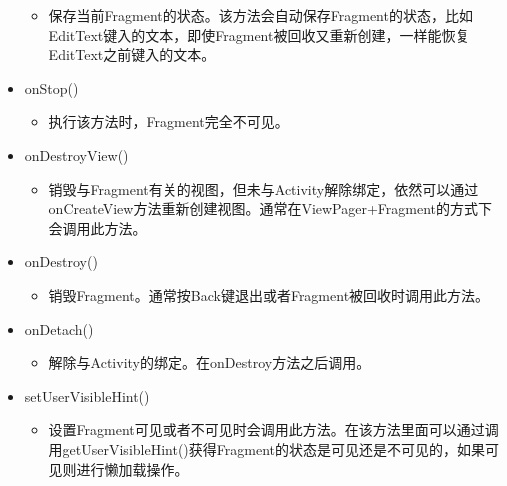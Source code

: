 \documentclass[9pt, b5paper]{article}
\begin{document}
\begin{itemize}
\begin{itemize}
\item 保存当前Fragment的状态。该方法会自动保存Fragment的状态，比如EditText键入的文本，即使Fragment被回收又重新创建，一样能恢复EditText之前键入的文本。
\end{itemize}
\item onStop()
\begin{itemize}
\item 执行该方法时，Fragment完全不可见。
\end{itemize}
\item onDestroyView()
\begin{itemize}
\item 销毁与Fragment有关的视图，但未与Activity解除绑定，依然可以通过onCreateView方法重新创建视图。通常在ViewPager+Fragment的方式下会调用此方法。
\end{itemize}
\item onDestroy()
\begin{itemize}
\item 销毁Fragment。通常按Back键退出或者Fragment被回收时调用此方法。
\end{itemize}
\item onDetach()
\begin{itemize}
\item 解除与Activity的绑定。在onDestroy方法之后调用。
\end{itemize}
\item setUserVisibleHint()
\begin{itemize}
\item 设置Fragment可见或者不可见时会调用此方法。在该方法里面可以通过调用getUserVisibleHint()获得Fragment的状态是可见还是不可见的，如果可见则进行懒加载操作。
\end{itemize}
\end{itemize}
\end{document}
